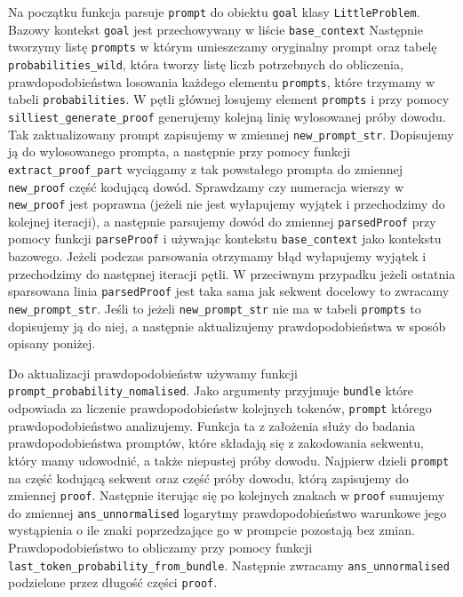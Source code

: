 \documentclass{article}
\begin{document}
Na początku funkcja parsuje \texttt{prompt} do obiektu \texttt{goal} klasy \texttt{LittleProblem}. Bazowy kontekst \texttt{goal} jest przechowywany w liście \texttt{base\_context} Następnie tworzymy listę \texttt{prompts} w którym umieszczamy oryginalny prompt oraz tabelę \texttt{probabilities\_wild}, 
która tworzy listę liczb potrzebnych do obliczenia, prawdopodobieństwa losowania każdego elementu \texttt{prompts}, które trzymamy w tabeli \texttt{probabilities}. 
W pętli głównej losujemy element \texttt{prompts} i przy pomocy \texttt{silliest\_generate\_proof} 
generujemy kolejną linię wylosowanej próby dowodu. Tak zaktualizowany prompt zapisujemy  w zmiennej \texttt{new\_prompt\_str}. Dopisujemy ją do wylosowanego prompta, a następnie przy pomocy funkcji \texttt{extract\_proof\_part} wyciągamy z tak powstałego prompta do zmiennej 
\texttt{new\_proof} część kodującą dowód. Sprawdzamy czy numeracja wierszy w \texttt{new\_proof} jest poprawna (jeżeli nie jest wyłapujemy wyjątek i przechodzimy do kolejnej iteracji), a następnie parsujemy dowód do zmiennej \texttt{parsedProof} przy pomocy funkcji \texttt{parseProof} i używając kontekstu \texttt{base\_context} jako kontekstu bazowego. 
Jeżeli podczas parsowania otrzymamy błąd wyłapujemy wyjątek i przechodzimy do następnej iteracji pętli. W przeciwnym przypadku jeżeli ostatnia sparsowana linia \texttt{parsedProof} jest taka sama jak sekwent docelowy to zwracamy 
\texttt{new\_prompt\_str}. Jeśli to jeżeli \texttt{new\_prompt\_str} nie ma w tabeli \texttt{prompts} to dopisujemy ją do niej, a następnie aktualizujemy prawdopodobieństwa w sposób opisany poniżej.

Do aktualizacji prawdopodobieństw używamy funkcji \texttt{prompt\_probability\_nomalised}. Jako argumenty przyjmuje \texttt{bundle} które odpowiada za liczenie prawdopodobieństw kolejnych tokenów, \texttt{prompt} którego prawdopodobieństwo
analizujemy. Funkcja ta z założenia służy do badania prawdopodobieństwa promptów, które składają się z zakodowania sekwentu, który mamy udowodnić, 
a także niepustej próby dowodu. Najpierw dzieli \texttt{prompt} na część kodującą sekwent oraz część próby dowodu, którą zapisujemy do zmiennej \texttt{proof}. Następnie iterując się po kolejnych znakach w 
\texttt{proof} sumujemy do zmiennej \texttt{ans\_unnormalised} logarytmy prawdopodobieństwo warunkowe jego wystąpienia o ile znaki poprzedzające go w prompcie pozostają bez zmian. Prawdopodobieństwo to obliczamy przy pomocy funkcji 
\texttt{last\_token\_probability\_from\_bundle}. Następnie zwracamy \texttt{ans\_unnormalised} podzielone przez długość części \texttt{proof}.
\end{document}
